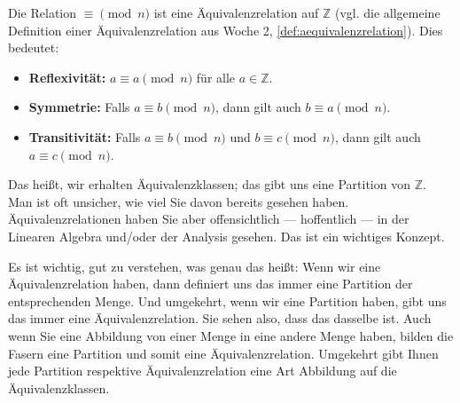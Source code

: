 \begin{math-stroke}

\begin{explanation-of-steps}
Die Relation $\equiv \pmod n$ ist eine Äquivalenzrelation auf $\mathbb{Z}$ (vgl. die allgemeine Definition einer Äquivalenzrelation aus Woche 2, \cref{def:aequivalenzrelation}). Dies bedeutet:
\begin{itemize}
    \item \textbf{Reflexivität:} $a \equiv a \pmod n$ für alle $a \in \mathbb{Z}$.
    \item \textbf{Symmetrie:} Falls $a \equiv b \pmod n$, dann gilt auch $b \equiv a \pmod n$.
    \item \textbf{Transitivität:} Falls $a \equiv b \pmod n$ und $b \equiv c \pmod n$, dann gilt auch $a \equiv c \pmod n$.
\end{itemize}
\end{explanation-of-steps}
\end{math-stroke}

\begin{spoken-clean}[00:01:08 - 00:03:14]
Das heißt, wir erhalten Äquivalenzklassen; das gibt uns eine Partition von $\mathbb{Z}$. Man ist oft unsicher, wie viel Sie davon bereits gesehen haben. Äquivalenzrelationen haben Sie aber offensichtlich --- hoffentlich --- in der Linearen Algebra und/oder der Analysis gesehen. Das ist ein wichtiges Konzept.

Es ist wichtig, gut zu verstehen, was genau das heißt: Wenn wir eine Äquivalenzrelation haben, dann definiert uns das immer eine Partition der entsprechenden Menge. Und umgekehrt, wenn wir eine Partition haben, gibt uns das immer eine Äquivalenzrelation. Sie sehen also, dass das dasselbe ist. Auch wenn Sie eine Abbildung von einer Menge in eine andere Menge haben, bilden die Fasern eine Partition und somit eine Äquivalenzrelation. Umgekehrt gibt Ihnen jede Partition respektive Äquivalenzrelation eine Art Abbildung auf die Äquivalenzklassen.
\end{spoken-clean}

